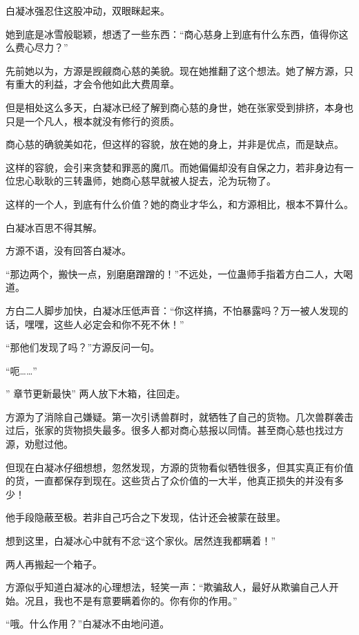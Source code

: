 
\begin{this_body}

白凝冰强忍住这股冲动，双眼眯起来。

她到底是冰雪般聪颖，想透了一些东西：“商心慈身上到底有什么东西，值得你这么费心尽力？”

先前她以为，方源是觊觎商心慈的美貌。现在她推翻了这个想法。她了解方源，只有重大的利益，才会令他如此大费周章。

但是相处这么多天，白凝冰已经了解到商心慈的身世，她在张家受到排挤，本身也只是一个凡人，根本就没有修行的资质。

商心慈的确貌美如花，但这样的容貌，放在她的身上，并非是优点，而是缺点。

这样的容貌，会引来贪婪和罪恶的魔爪。而她偏偏却没有自保之力，若非身边有一位忠心耿耿的三转蛊师，她商心慈早就被人捉去，沦为玩物了。

这样的一个人，到底有什么价值？她的商业才华么，和方源相比，根本不算什么。

白凝冰百思不得其解。

方源不语，没有回答白凝冰。

“那边两个，搬快一点，别磨磨蹭蹭的！”不远处，一位蛊师手指着方白二人，大喝道。

方白二人脚步加快，白凝冰压低声音：“你这样搞，不怕暴露吗？万一被人发现的话，嘿嘿，这些人必定会和你不死不休！”

“那他们发现了吗？”方源反问一句。

“呃……”

” 章节更新最快” 两人放下木箱，往回走。

方源为了消除自己嫌疑。第一次引诱兽群时，就牺牲了自己的货物。几次兽群袭击过后，张家的货物损失最多。很多人都对商心慈报以同情。甚至商心慈也找过方源，劝慰过他。

但现在白凝冰仔细想想，忽然发现，方源的货物看似牺牲很多，但其实真正有价值的货，一直都保存到现在。这些货占了众价值的一大半，他真正损失的并没有多少！

他手段隐蔽至极。若非自己巧合之下发现，估计还会被蒙在鼓里。

想到这里，白凝冰心中就有不忿“这个家伙。居然连我都瞒着！”

两人再搬起一个箱子。

方源似乎知道白凝冰的心理想法，轻笑一声：“欺骗敌人，最好从欺骗自己人开始。况且，我也不是有意要瞒着你的。你有你的作用。”

“哦。什么作用？”白凝冰不由地问道。


\end{this_body}
